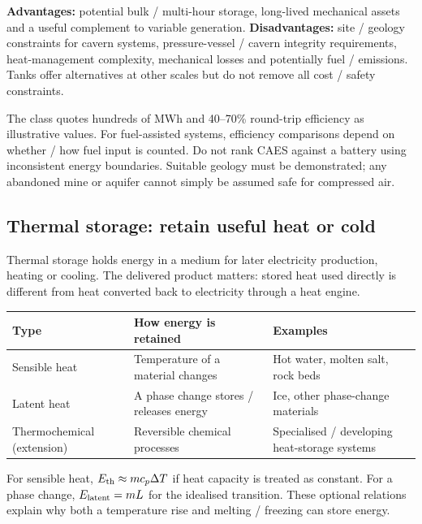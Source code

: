 \documentclass[11pt,a4paper]{article}
\begin{document}
\textbf{Advantages:} potential bulk / multi-hour storage, long-lived mechanical assets and a useful complement to variable generation. \textbf{Disadvantages:} site / geology constraints for cavern systems, pressure-vessel / cavern integrity requirements, heat-management complexity, mechanical losses and potentially fuel / emissions. Tanks offer alternatives at other scales but do not remove all cost / safety constraints.

The class quotes hundreds of MWh and 40--70\% round-trip efficiency as illustrative values. For fuel-assisted systems, efficiency comparisons depend on whether / how fuel input is counted. Do not rank CAES against a battery using inconsistent energy boundaries. Suitable geology must be demonstrated; any abandoned mine or aquifer cannot simply be assumed safe for compressed air.

\subsection{Thermal storage: retain useful heat or cold}
Thermal storage holds energy in a medium for later electricity production, heating or cooling. The delivered product matters: stored heat used directly is different from heat converted back to electricity through a heat engine.

\begin{center}\small
\begin{tabularx}{\textwidth}{L{3cm}YY}
\toprule\textbf{Type} & \textbf{How energy is retained} & \textbf{Examples}\\\midrule
Sensible heat & Temperature of a material changes & Hot water, molten salt, rock beds\\
Latent heat & A phase change stores / releases energy & Ice, other phase-change materials\\
Thermochemical (extension) & Reversible chemical processes & Specialised / developing heat-storage systems\\\bottomrule
\end{tabularx}\end{center}
For sensible heat, $E_{\rm th}\approx m c_p\Delta T$ if heat capacity is treated as constant. For a phase change, $E_{\rm latent}=mL$ for the idealised transition. These optional relations explain why both a temperature rise and melting / freezing can store energy.
\end{document}
